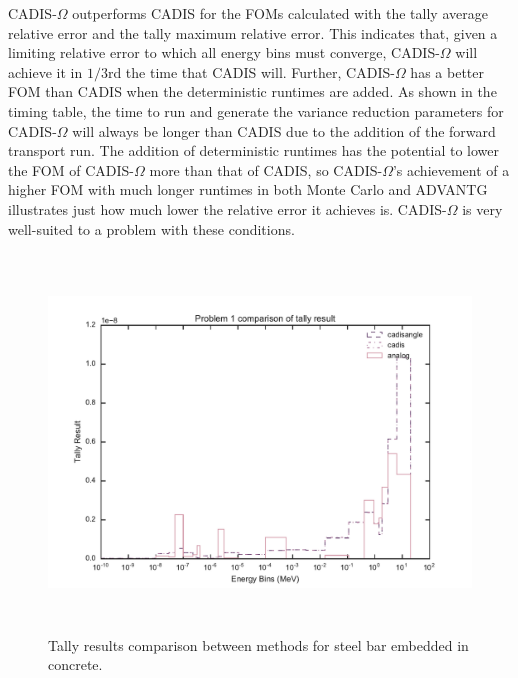 CADIS-$\Omega$ outperforms CADIS for
the FOMs calculated with the tally average relative error and the tally maximum
relative error. This indicates that, given a limiting relative error to which
all energy bins must converge, CADIS-$\Omega$ will achieve it in $1/3$rd the time
that CADIS will. Further, CADIS-$\Omega$ has a better FOM than CADIS when the
deterministic runtimes are added. As shown in the timing table, the time to run
and generate the variance reduction parameters for CADIS-$\Omega$ will always be
longer than CADIS due to the addition of the forward transport run. The addition of
deterministic runtimes has the potential to lower the FOM of CADIS-$\Omega$ more than
that of CADIS, so CADIS-$\Omega$'s achievement of a higher FOM with much
longer runtimes in both Monte Carlo and ADVANTG illustrates just how much lower
the relative error it achieves is. CADIS-$\Omega$ is very well-suited to a
problem with these conditions.

\begin{figure}[h!]
  \centering
  \includegraphics[height=10cm]{./chapters/characterization_probs/figures/char/prob_1/problem_1_tally_result_compare.pdf}
  \caption[Tally results comparison between methods for steel bar embedded in
  concrete.]
  {Tally results comparison between methods for steel bar embedded in concrete.}
  \label{fig:steelbeamresult}
\end{figure}


